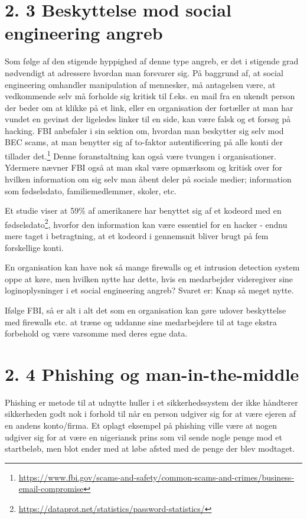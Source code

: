 \documentclass[11pt]{report}
\begin{document}
\section*{2. 3 Beskyttelse mod social engineering angreb}
Som følge af den stigende hyppighed af denne type angreb, er det i stigende grad nødvendigt at adressere hvordan man forsvarer sig. På baggrund af, at social engineering omhandler manipulation af mennesker, må antagelsen være, at vedkommende selv må forholde sig kritisk til f.eks. en mail fra en ukendt person der beder om at klikke på et link, eller en organisation der fortæller at man har vundet en gevinst der ligeledes linker til en side, kan være falsk og et forsøg på hacking.
FBI anbefaler i sin sektion om, hvordan man beskytter sig selv mod BEC scams, at man benytter sig af to-faktor autentificering på alle konti der tillader det.\footnote{\url{https://www.fbi.gov/scams-and-safety/common-scams-and-crimes/business-email-compromise}} Denne foranstaltning kan også være tvungen i organisationer. Ydermere nævner FBI også at man skal være opmærksom og kritisk over for hvilken information om sig selv man åbent deler på sociale medier; information som fødselsdato, familiemedlemmer, skoler, etc.

Et studie viser at 59\% af amerikanere har benyttet sig af et kodeord med en fødselsdato\footnote{\url{https://dataprot.net/statistics/password-statistics/}}, hvorfor den information kan være essentiel for en hacker - endnu mere taget i betragtning, at et kodeord i gennemsnit bliver brugt på fem forskellige konti.

En organisation kan have nok så mange firewalls og et intrusion detection system oppe at køre, men hvilken nytte har dette, hvis en medarbejder videregiver sine loginoplysninger i et social engineering angreb? Svaret er: Knap så meget nytte.


Ifølge FBI, så er alt i alt det som en organisation kan gøre udover beskyttelse med firewalls etc. at træne og uddanne sine medarbejdere til at tage ekstra forbehold og være varsomme med deres egne data.

\section*{2. 4 Phishing og man-in-the-middle}
Phishing er metode til at udnytte huller i et sikkerhedssystem der ikke håndterer sikkerheden godt nok i forhold til når en person udgiver sig for at være ejeren af en andens konto/firma. Et oplagt eksempel på phishing ville være at nogen udgiver sig for at være en nigeriansk prins som vil sende nogle penge mod et startbeløb, men blot ender med at løbe afsted med de penge der blev modtaget. 
\end{document}
